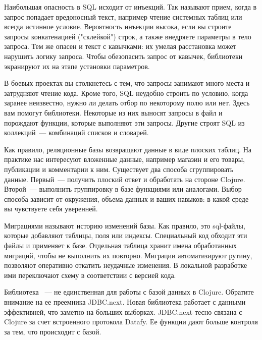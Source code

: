 Наибольшая опасность в SQL исходит от инъекций. Так называют прием, когда в запрос попадает вредоносный текст, например чтение системных таблиц или всегда истинное условие. Вероятность инъекции высока, если вы строите запросы конкатенацией ("склейкой") строк, а также внедряете параметры в тело запроса. Тем же опасен и текст с кавычками: их умелая расстановка может нарушить логику запроса. Чтобы обезопасить запрос от кавычек, библиотеки экранируют их на этапе установки параметров.

В боевых проектах вы столкнетесь с тем, что запросы занимают много места и затрудняют чтение кода. Кроме того, SQL неудобно строить по условию, когда заранее неизвестно, нужно ли делать отбор по некоторому полю или нет. Здесь вам помогут библиотеки. Некоторые из них выносят запросы в файл и порождают функции, которые выполняют эти запросы. Другие строят SQL из коллекций~--- комбинаций списков и словарей.

Как правило, реляционные базы возвращают данные в виде плоских таблиц. На практике нас интересуют вложенные данные, например магазин и его товары, публикации и комментарии к ним. Существует два способа сгруппировать данные. Первый~--- получить плоский ответ и обработать на стороне Clojure. Второй~--- выполнить группировку в базе функциями  или аналогами. Выбор способа зависит от окружения, объема данных и ваших навыков: в какой среде вы чувствуете себя уверенней.

Миграциями называют историю изменений базы. Как правило, это sql-файлы, которые добавляют таблицы, поля или индексы. Специальный код обходит эти файлы и применяет к базе. Отдельная таблица хранит имена обработанных миграций, чтобы не выполнить их повторно. Миграции автоматизируют рутину, позволяют оперативно откатить неудачные изменения. В локальной разработке ими переключают схему в соответствии с версией кода.

Библиотека ~--- не единственная для работы с базой данных в Clojure. Обратите внимание на ее преемника JDBC.next. Новая библиотека работает с данными эффективней, что заметно на больших выборках. JDBC.next тесно связана с Clojure за счет встроенного протокола Datafy. Ее функции дают больше контроля за тем, что происходит с базой.

